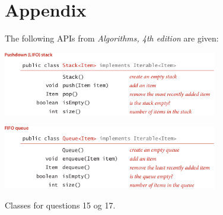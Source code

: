 \documentclass[addpoints]{exam}
\begin{document}
\section{Appendix}
The following APIs from \emph{Algorithms, 4th edition} are given:
\begin{center}

	\includegraphics[width=0.7\textwidth]{Pics/API-Stack}

	\vspace{0.5cm}

	\includegraphics[width=0.7\textwidth]{Pics/API-Queue}









    
\end{center}

	Classes for questions 15 og 17.
	\begin{multicols}{2}

        \vspace{1cm}

	\end{multicols}
\end{document}
